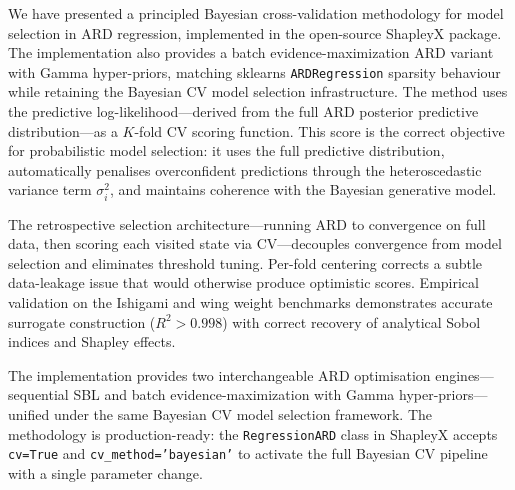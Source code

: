 \documentclass[11pt,a4paper]{article}
\begin{document}
We have presented a principled Bayesian cross-validation methodology for model selection in ARD regression, implemented in the open-source ShapleyX package.  The implementation also provides a batch evidence-maximization ARD variant with Gamma hyper-priors, matching sklearn\textquotesingle s \texttt{ARDRegression} sparsity behaviour while retaining the Bayesian CV model selection infrastructure. The method uses the predictive log-likelihood---derived from the full ARD posterior predictive distribution---as a $K$-fold CV scoring function. This score is the correct objective for probabilistic model selection: it uses the full predictive distribution, automatically penalises overconfident predictions through the heteroscedastic variance term $\sigma_i^2$, and maintains coherence with the Bayesian generative model.

The retrospective selection architecture---running ARD to convergence on full data, then scoring each visited state via CV---decouples convergence from model selection and eliminates threshold tuning. Per-fold centering corrects a subtle data-leakage issue that would otherwise produce optimistic scores. Empirical validation on the Ishigami and wing weight benchmarks demonstrates accurate surrogate construction ($R^2 > 0.998$) with correct recovery of analytical Sobol indices and Shapley effects.

The implementation provides two interchangeable ARD optimisation engines---sequential SBL and batch evidence-maximization with Gamma hyper-priors---unified under the same Bayesian CV model selection framework.  The methodology is production-ready: the \texttt{RegressionARD} class in ShapleyX accepts \texttt{cv=True} and \texttt{cv\_method='bayesian'} to activate the full Bayesian CV pipeline with a single parameter change.
\end{document}
